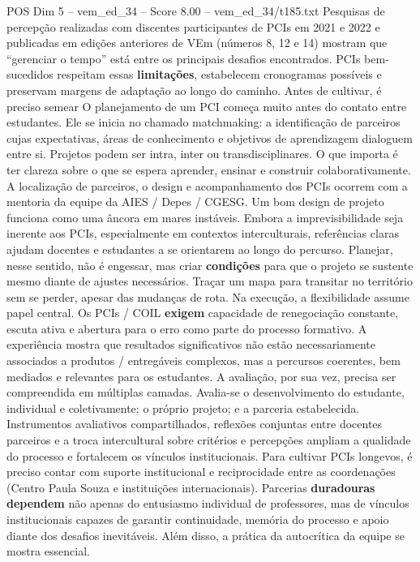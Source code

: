 \begin{textsample}{POS Dim 5 – vem\_ed\_34 – Score 8.00 – vem\_ed\_34/t185.txt}
Pesquisas de percepção realizadas com discentes participantes de PCIs em 2021 e 2022 e publicadas em edições anteriores de VEm (números 8, 12 e 14) mostram que “gerenciar o tempo” está entre os principais desafios encontrados.
PCIs bem-sucedidos respeitam essas \textbf{limitações}, estabelecem cronogramas possíveis e preservam margens de adaptação ao longo do caminho.
Antes de cultivar, é preciso semear O planejamento de um PCI começa muito antes do contato entre estudantes.
Ele se inicia no chamado matchmaking: a identificação de parceiros cujas expectativas, áreas de conhecimento e objetivos de aprendizagem dialoguem entre si.
Projetos podem ser intra, inter ou transdisciplinares.
O que importa é ter clareza sobre o que se espera aprender, ensinar e construir colaborativamente.
A localização de parceiros, o design e acompanhamento dos PCIs ocorrem com a mentoria da equipe da AIES / Depes / CGESG.
Um bom design de projeto funciona como uma âncora em mares instáveis.
Embora a imprevisibilidade seja inerente aos PCIs, especialmente em contextos interculturais, referências claras ajudam docentes e estudantes a se orientarem ao longo do percurso.
Planejar, nesse sentido, não é engessar, mas criar \textbf{condições} para que o projeto se sustente mesmo diante de ajustes necessários.
Traçar um mapa para transitar no território sem se perder, apesar das mudanças de rota.
Na execução, a flexibilidade assume papel central.
Os PCIs / COIL \textbf{exigem} capacidade de renegociação constante, escuta ativa e abertura para o erro como parte do processo formativo.
A experiência mostra que resultados significativos não estão necessariamente associados a produtos / entregáveis complexos, mas a percursos coerentes, bem mediados e relevantes para os estudantes.
A avaliação, por sua vez, precisa ser compreendida em múltiplas camadas.
Avalia-se o desenvolvimento do estudante, individual e coletivamente; o próprio projeto; e a parceria estabelecida.
Instrumentos avaliativos compartilhados, reflexões conjuntas entre docentes parceiros e a troca intercultural sobre critérios e percepções ampliam a qualidade do processo e fortalecem os vínculos institucionais.
Para cultivar PCIs longevos, é preciso contar com suporte institucional e reciprocidade entre as coordenações (Centro Paula Souza e instituições internacionais).
Parcerias \textbf{duradouras} \textbf{dependem} não apenas do entusiasmo individual de professores, mas de vínculos institucionais capazes de garantir continuidade, memória do processo e apoio diante dos desafios inevitáveis.
Além disso, a prática da autocrítica da equipe se mostra essencial.

\end{textsample}
